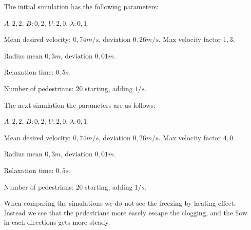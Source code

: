 The initial simulation has the following parameters:

\begin{itemize*}
    \item $A: 2,2$, $B: 0,2$, $U: 2,0$, $\lambda: 0,1$.
    \item Mean desired velocity: $0,74 m/s$, deviation $0,26 m/s$. Max 
        velocity factor $1,3$.
    \item Radius mean $0,3 m$, deviation $0,01 m$.
    \item Relaxation time: $0,5 s$.
    \item Number of pedestrians: $20$ starting, adding $1/s$.
\end{itemize*}

The next simulation the parameters are as follows:

\begin{itemize*}
    \item $A: 2,2$, $B: 0,2$, $U: 2,0$, $\lambda: 0,1$.
    \item Mean desired velocity: $0,74 m/s$, deviation $0,26 m/s$. Max 
        velocity factor $4,0$.
    \item Radius mean $0,3 m$, deviation $0,01 m$.
    \item Relaxation time: $0,5 s$.
    \item Number of pedestrians: $20$ starting, adding $1/s$.
\end{itemize*}

When comparing the simulations we do not see the freezing by heating effect.
Instead we see that the pedestrians more easely escape the clogging, and the flow in each directions
gets more steady.

